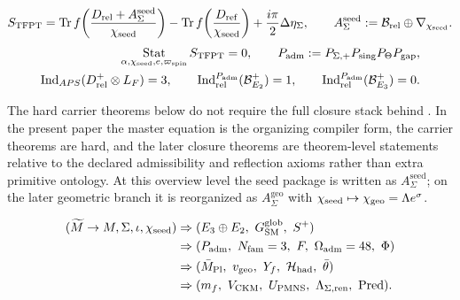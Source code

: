 \begin{tcolorbox}[colback=blue!3, colframe=blue!50!black, breakable,
    title={\textbf{TFPT master equation and selectors}}, fonttitle=\bfseries]
\begin{equation}
\label{eq:tfpt-master}
\begin{aligned}
S_{\mathrm{TFPT}}
=
\operatorname{Tr}f\!\left(\frac{D_{\mathrm{rel}}+A_{\Sigma}^{\mathrm{seed}}}{\chi_{\mathrm{seed}}}\right)
-
\operatorname{Tr}f\!\left(\frac{D_{\mathrm{ref}}}{\chi_{\mathrm{seed}}}\right)
+\frac{i\pi}{2}\Delta\eta_\Sigma,
\qquad
A_{\Sigma}^{\mathrm{seed}}:=\mathcal B_{\mathrm{rel}}\oplus\nabla_{\chi_{\mathrm{seed}}}.
\end{aligned}
\end{equation}
\begin{equation}
\label{eq:tfpt-selectors}
\begin{aligned}
\operatorname*{Stat}_{\alpha,\chi_{\mathrm{seed}},e,\varpi_{\mathrm{spin}}}S_{\mathrm{TFPT}}=0,
\qquad
P_{\mathrm{adm}}:=P_{\Sigma,+}P_{\mathrm{sing}}P_\Theta P_{\mathrm{gap}},
\\
\operatorname{Ind}_{APS}(D^+_{\mathrm{rel}}\otimes L_F)=3,
\qquad
\operatorname{Ind}^{P_{\mathrm{adm}}}_{\mathrm{rel}}(\mathcal B^+_{E_2})=1,
\qquad
\operatorname{Ind}^{P_{\mathrm{adm}}}_{\mathrm{rel}}(\mathcal B^+_{E_3})=0.
\end{aligned}
\end{equation}
\end{tcolorbox}

The hard carrier theorems below do not require the full closure stack behind . In the present paper the master equation is the organizing compiler form, the carrier theorems are hard, and the later closure theorems are theorem-level statements relative to the declared admissibility and reflection axioms rather than extra primitive ontology. At this overview level the seed package is written as $A_{\Sigma}^{\mathrm{seed}}$; on the later geometric branch it is reorganized as $A_{\Sigma}^{\mathrm{geo}}$ with $\chi_{\mathrm{seed}}\mapsto\chi_{\mathrm{geo}}=\Lambda e^\sigma$.

\begin{tcolorbox}[colback=blue!3, colframe=blue!50!black, breakable,
    title={\textbf{Carrier-first compiler chain}}, fonttitle=\bfseries]
\begin{equation}
\label{eq:compiler-chain}
\begin{aligned}
(\widetilde M\to M,\Seam,\inv,\chiseed)
&\Rightarrow
(E_3\oplus E_2,\ G_{\SM}^{\mathrm{glob}},\ S^+)\\
&\Rightarrow
( \Padm,\ N_{\mathrm{fam}}=3,\ F,\ \Oadm=48,\ \Phi)\\
&\Rightarrow
( \Mpl,\ \vgeo,\ Y_f,\ \Hhad,\ \bar\theta )\\
&\Rightarrow
(m_f,\ V_{\mathrm{CKM}},\ U_{\mathrm{PMNS}},\ \Lambda_{\Seam,\mathrm{ren}},\ \Pred).
\end{aligned}
\end{equation}
\end{tcolorbox}

